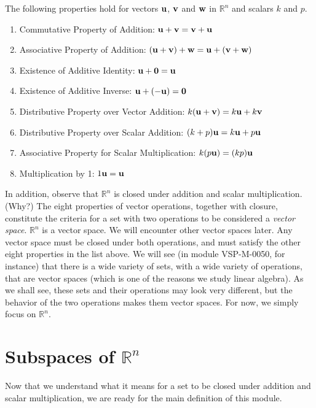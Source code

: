 \documentclass{ximera}
\renewcommand{\vec}[1]{{\bf #1}}
\newcommand{\RR}{\mathbb{R}}
\newcommand{\dfn}{\textit}
\begin{document}
\begin{theorem}\label{th:vecproperties} The following properties hold for vectors ${\bf u}$, ${\bf v}$ and ${\bf w}$ in $\mathbb{R}^n$ and scalars $k$ and $p$.
\begin{enumerate}
  \item 
  Commutative Property of Addition:
  $\vec{u}+\vec{v}=\vec{v}+\vec{u}$
  \item 
  Associative Property of Addition:
  $(\vec{u}+\vec{v})+\vec{w}=\vec{u}+(\vec{v}+\vec{w})$
  \item 
  Existence of Additive Identity:
  $\vec{u}+\vec{0}=\vec{u}$
  \item 
  Existence of Additive Inverse:
  $\vec{u}+(-\vec{u})=\vec{0}$
  \item
  Distributive Property over Vector Addition:
  $k(\vec{u}+\vec{v})=k\vec{u}+k\vec{v}$
  \item
  Distributive Property over Scalar Addition:
  $(k+p)\vec{u}=k\vec{u}+p\vec{u}$
  \item 
  Associative Property for Scalar Multiplication:
  $k(p\vec{u})=(kp)\vec{u}$
  \item 
  Multiplication by 1:
  $1\vec{u}=\vec{u}$
  \end{enumerate}
\end{theorem}

  
  In addition, observe that $\RR^n$ is closed under addition and scalar multiplication.  (Why?)  The eight properties of vector operations, together with closure, constitute the criteria for a set with two operations to be considered a \dfn{vector space}.  $\RR^n$ is a vector space.  We will encounter other vector spaces later. Any vector space must be closed under both operations, and must satisfy the other eight properties in the list above.  We will see (in module VSP-M-0050, for instance) that there is a wide variety of sets, with a wide variety of operations, that are vector spaces (which is one of the reasons we study linear algebra).  As we shall see, these sets and their operations may look very different, but the behavior of the two operations makes them vector spaces.  For now, we simply focus on $\RR^n$.


\section*{Subspaces of $\RR^n$}

Now that we understand what it means for a set to be closed under addition and scalar multiplication, we are ready for the main definition of this module.
\end{document}
